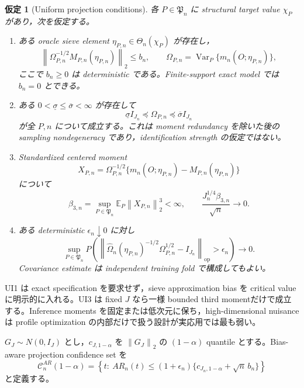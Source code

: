 \documentclass[11pt,a4paper]{ltjsarticle}
\newtheorem{assumption}{仮定}[section]
\theoremstyle{remark}
\newcommand{\E}{\mathbb E}
\newcommand{\wh}{\widehat}
\newcommand{\norm}[1]{\left\lVert#1\right\rVert}
\newcommand{\cC}{\mathcal C}
\newcommand{\Var}{\operatorname{Var}}
\newcommand{\op}{\operatorname{op}}
\begin{document}
\begin{assumption}[Uniform projection conditions]\label{as:uniformAR}
各 $P\in\mathfrak P_n$ に structural target value $\chi_P$ があり，次を仮定する。
\begin{enumerate}[label=(UI\arabic*)]
\item ある oracle sieve element $\eta_{P,n}\in\Theta_n(\chi_P)$ が存在し，
\begin{equation}
\left\|
\Omega_{P,n}^{-1/2}M_{P,n}(\eta_{P,n})
\right\|_2\le b_n,
\qquad
\Omega_{P,n}=\Var_P\{m_n(O;\eta_{P,n})\},
\label{eq:oraclebias}
\end{equation}
ここで $b_n\ge0$ は deterministic である。Finite-support exact model では $b_n=0$ とできる。
\item ある $0<\underline\sigma\le\overline\sigma<\infty$ が存在して
\begin{equation}
\underline\sigma I_{J_n}\preceq\Omega_{P,n}
\preceq\overline\sigma I_{J_n}
\label{eq:omegaboundsAR}
\end{equation}
が全 $P,n$ について成立する。これは moment redundancy を除いた後の sampling nondegeneracy であり，identification strength の仮定ではない。
\item Standardized centered moment
\[
X_{P,n}
=\Omega_{P,n}^{-1/2}
\{m_n(O;\eta_{P,n})-M_{P,n}(\eta_{P,n})\}
\]
について
\begin{equation}
\beta_{3,n}
=\sup_{P\in\mathfrak P_n}\E_P\norm{X_{P,n}}_2^3<\infty,
\qquad
\frac{J_n^{1/4}\beta_{3,n}}{\sqrt n}\longrightarrow0.
\label{eq:Bentkuscondition}
\end{equation}
\item ある deterministic $\epsilon_n\downarrow0$ に対し
\begin{equation}
\sup_{P\in\mathfrak P_n}
P\left(
\left\|
\wh\Omega_n(\eta_{P,n})^{-1/2}
\Omega_{P,n}^{1/2}-I_{J_n}
\right\|_{\op}>\epsilon_n
\right)\longrightarrow0.
\label{eq:covuniformAR}
\end{equation}
Covariance estimate は independent training fold で構成してもよい。
\end{enumerate}
\end{assumption}

UI1 は exact specification を要求せず，sieve approximation bias を critical value に明示的に入れる。UI3 は fixed $J$ なら一様 bounded third momentだけで成立する。Inference moments を固定または低次元に保ち，high-dimensional nuisance は profile optimization の内部だけで扱う設計が実応用では最も弱い。

$G_J\sim N(0,I_J)$ とし，$c_{J,1-\alpha}$ を $\norm{G_J}_2$ の $(1-\alpha)$ quantile とする。Bias-aware projection confidence set を
\begin{equation}
\cC_n^{AR}(1-\alpha)
=\left\{
 t:\ AR_n(t)
\le(1+\epsilon_n)
\{c_{J_n,1-\alpha}+\sqrt n\,b_n\}
\right\}
\label{eq:ARCS}
\end{equation}
と定義する。
\end{document}
